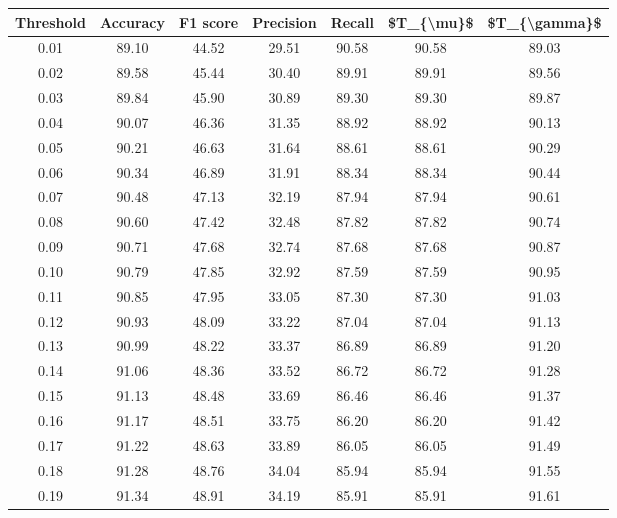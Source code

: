 \begin{tabular}{|c|c|c|c|c|c|c|}
\hline
 Threshold &  Accuracy &  F1 score &  Precision &  Recall &  \$T\_\{\textbackslash mu\}\$ &  \$T\_\{\textbackslash gamma\}\$ \\
\hline
      0.01 &     89.10 &     44.52 &      29.51 &   90.58 &      90.58 &         89.03 \\
      0.02 &     89.58 &     45.44 &      30.40 &   89.91 &      89.91 &         89.56 \\
      0.03 &     89.84 &     45.90 &      30.89 &   89.30 &      89.30 &         89.87 \\
      0.04 &     90.07 &     46.36 &      31.35 &   88.92 &      88.92 &         90.13 \\
      0.05 &     90.21 &     46.63 &      31.64 &   88.61 &      88.61 &         90.29 \\
      0.06 &     90.34 &     46.89 &      31.91 &   88.34 &      88.34 &         90.44 \\
      0.07 &     90.48 &     47.13 &      32.19 &   87.94 &      87.94 &         90.61 \\
      0.08 &     90.60 &     47.42 &      32.48 &   87.82 &      87.82 &         90.74 \\
      0.09 &     90.71 &     47.68 &      32.74 &   87.68 &      87.68 &         90.87 \\
      0.10 &     90.79 &     47.85 &      32.92 &   87.59 &      87.59 &         90.95 \\
      0.11 &     90.85 &     47.95 &      33.05 &   87.30 &      87.30 &         91.03 \\
      0.12 &     90.93 &     48.09 &      33.22 &   87.04 &      87.04 &         91.13 \\
      0.13 &     90.99 &     48.22 &      33.37 &   86.89 &      86.89 &         91.20 \\
      0.14 &     91.06 &     48.36 &      33.52 &   86.72 &      86.72 &         91.28 \\
      0.15 &     91.13 &     48.48 &      33.69 &   86.46 &      86.46 &         91.37 \\
      0.16 &     91.17 &     48.51 &      33.75 &   86.20 &      86.20 &         91.42 \\
      0.17 &     91.22 &     48.63 &      33.89 &   86.05 &      86.05 &         91.49 \\
      0.18 &     91.28 &     48.76 &      34.04 &   85.94 &      85.94 &         91.55 \\
      0.19 &     91.34 &     48.91 &      34.19 &   85.91 &      85.91 &         91.61 \\

\end{tabular}
